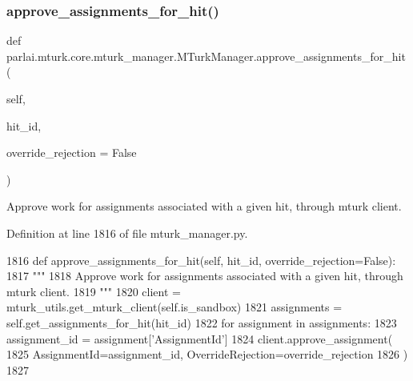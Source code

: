 \subsubsection{\texorpdfstring{approve\+\_\+assignments\+\_\+for\+\_\+hit()}{approve\_assignments\_for\_hit()}}
{\footnotesize\ttfamily def parlai.\+mturk.\+core.\+mturk\+\_\+manager.\+M\+Turk\+Manager.\+approve\+\_\+assignments\+\_\+for\+\_\+hit (\begin{DoxyParamCaption}\item[{}]{self,  }\item[{}]{hit\+\_\+id,  }\item[{}]{override\+\_\+rejection = {\ttfamily False} }\end{DoxyParamCaption})}

\begin{DoxyVerb}Approve work for assignments associated with a given hit, through mturk client.
\end{DoxyVerb}
 

Definition at line 1816 of file mturk\+\_\+manager.\+py.


\begin{DoxyCode}
1816     \textcolor{keyword}{def }approve\_assignments\_for\_hit(self, hit\_id, override\_rejection=False):
1817         \textcolor{stringliteral}{"""}
1818 \textcolor{stringliteral}{        Approve work for assignments associated with a given hit, through mturk client.}
1819 \textcolor{stringliteral}{        """}
1820         client = mturk\_utils.get\_mturk\_client(self.is\_sandbox)
1821         assignments = self.get\_assignments\_for\_hit(hit\_id)
1822         \textcolor{keywordflow}{for} assignment \textcolor{keywordflow}{in} assignments:
1823             assignment\_id = assignment[\textcolor{stringliteral}{'AssignmentId'}]
1824             client.approve\_assignment(
1825                 AssignmentId=assignment\_id, OverrideRejection=override\_rejection
1826             )
1827 
\end{DoxyCode}
\mbox{\label{classparlai_1_1mturk_1_1core_1_1mturk__manager_1_1MTurkManager_a0accb6612484648ec2666c01a3597cf8}} 
